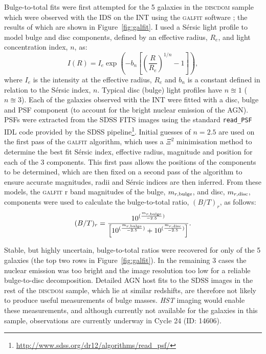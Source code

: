 Bulge-to-total fits were first attempted for the 5 galaxies in the \textsc{discdom} sample which were observed with the IDS on the INT using the \textsc{galfit} software \citep{peng02}; the results of which are shown in Figure~\ref{fig:galfit}. I used a S\'ersic light profile \citep{sersic68} to model bulge and disc components, defined by an effective radius, $R_e$, and light concentration index, $n$, as:
\begin{equation}\label{sersic}
I(R) = I_e \exp \left(  -b_n \left[  \left( \frac{R}{R_e}\right)^{1/n} -1 \right] \right),
\end{equation}
where $I_e$ is the intensity at the effective radius, $R_e$ and $b_n$ is a constant defined in relation to the S\'ersic index, $n$. Typical disc (bulge) light profiles have $n\approxeq1$ ($n\approxeq3$). Each of the galaxies observed with the INT were fitted with a disc, bulge and PSF component (to account for the bright nuclear emission of the AGN). PSFs were extracted from the SDSS FITS images using the standard \texttt{read\_PSF} IDL code provided by the SDSS pipeline\footnote{\url{http://www.sdss.org/dr12/algorithms/read_psf/}}. Initial guesses of $n=2.5$ are used on the first pass of the \textsc{galfit} algorithm, which uses a $\Xi^2$ minimisation method to determine the best fit S\'ersic index, effective radius, magnitude and position for each of the 3 components. This first pass allows the positions of the components to be determined, which are then fixed on a second pass of the algorithm to ensure accurate magnitudes, radii and S\'ersic indices are then inferred. From these models, the \textsc{galfit} r band magnitudes of the bulge, $m_{r, \rm{bulge}}$, and disc, $m_{r, \rm{disc}}$, components were used to calculate the bulge-to-total ratio, $(B/T)_r$, as follows:
\begin{equation}\label{btratio}
(B/T)_r = \frac{10^{(\frac{m_{r, \rm{bulge}}}{-2.5})}}{\left[10^{(\frac{m_{r, \rm{bulge}}}{-2.5})} + 10^{(\frac{m_{r, \rm{disc}}}{-2.5})}\right]}.
\end{equation}

Stable, but highly uncertain, bulge-to-total ratios were recovered for only {} of the 5 galaxies (the top two rows in Figure~\ref{fig:galfit}). In the remaining 3 cases the nuclear emission was too bright and the image resolution too low for a reliable bulge-to-disc decomposition.  Detailed AGN host fits to the SDSS images in the rest of the \textsc{discdom} sample, which lie at similar redshifts, are therefore not likely to produce useful measurements of bulge masses. \emph{HST} imaging would enable these measurements, and although currently not available for the galaxies in this sample, observations are currently underway in Cycle 24 (ID: 14606). 

